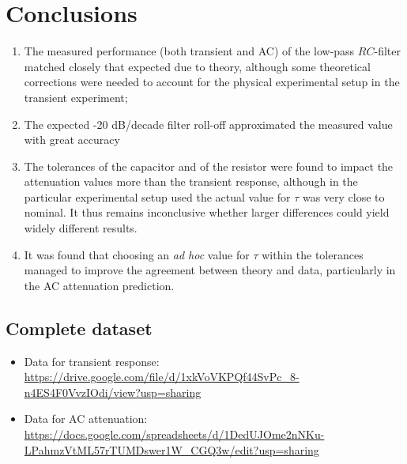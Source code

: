 \documentclass{article}
\begin{document}
\section{Conclusions}
\begin{enumerate}
    \item The measured performance (both transient and AC) of the low-pass $RC$-filter matched closely that expected due to theory, although some theoretical corrections were needed to account for the physical experimental setup in the transient experiment;
    \item The expected -20 dB/decade filter roll-off approximated the measured value with great accuracy
    \item The tolerances of the capacitor and of the resistor were found to impact the attenuation values more than the transient response, although in the particular experimental setup used the actual value for $\tau$ was very close to nominal. It thus remains inconclusive whether larger differences could yield widely different results.
    \item It was found that choosing an \textit{ad hoc} value for $\tau$ within the tolerances managed to improve the agreement between theory and data, particularly in the AC attenuation prediction.
\end{enumerate}
\begin{appendices}
\section{Complete dataset}
    \begin{itemize}
        \item Data for transient response: \\\url{https://drive.google.com/file/d/1xkVoVKPQf44SvPc_8-n4ES4F0VvzIOdi/view?usp=sharing}
        \item Data for AC attenuation: \\
        \url{https://docs.google.com/spreadsheets/d/1DedUJOme2nNKu-LPahmzVtML57rTUMDswer1W_CGQ3w/edit?usp=sharing}
    \end{itemize}
\end{appendices}
\end{document}
